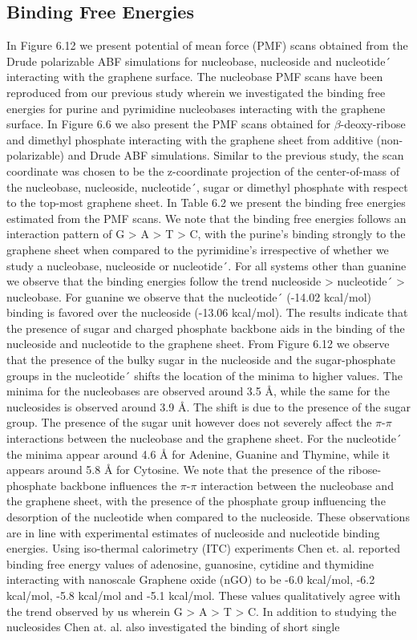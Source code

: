 \subsection[Binding Free Energies]{Binding Free Energies}
In Figure 6.12 we present potential of mean force (PMF) scans obtained from the Drude polarizable ABF simulations for nucleobase, nucleoside and nucleotide´ interacting with the graphene surface. The nucleobase PMF scans have been reproduced from our previous study wherein we investigated the binding free energies for purine and pyrimidine nucleobases interacting with the graphene surface.\supercite{h_polarization_2021} In Figure 6.6 we also present the PMF scans obtained for $\beta$-deoxy-ribose and dimethyl phosphate interacting with the graphene sheet from additive (non-polarizable) and Drude ABF simulations. Similar to the previous study, the scan coordinate was chosen to be the z-coordinate projection of the center-of-mass of the nucleobase, nucleoside, nucleotide´, sugar or dimethyl phosphate with respect to the top-most graphene sheet. In Table 6.2 we present the binding free energies estimated from the PMF scans. We note that the binding free energies follows an interaction pattern of G > A > T > C, with the purine’s binding strongly to the graphene sheet when compared to the pyrimidine’s irrespective of whether we study a nucleobase, nucleoside or nucleotide´. For all systems other than guanine we observe that the binding energies follow the trend nucleoside > nucleotide´ > nucleobase. For guanine we observe that the nucleotide´ (-14.02 kcal/mol) binding is favored over the nucleoside (-13.06 kcal/mol). The results indicate that the presence of sugar and charged phosphate backbone aids in the binding of the nucleoside and nucleotide to the graphene sheet. From Figure 6.12 we observe that the presence of the bulky sugar in the nucleoside and the sugar-phosphate groups in the nucleotide´ shifts the location of the minima to higher values. The minima for the nucleobases are observed around 3.5 Å, while the same for the nucleosides is observed around 3.9 Å. The shift is due to the presence of the sugar group. The presence of the sugar unit however does not severely affect the $\pi$-$\pi$ interactions between the nucleobase and the graphene sheet. For the nucleotide´ the minima appear around 4.6 Å for Adenine, Guanine and Thymine, while it appears around 5.8 Å for Cytosine. We note that the presence of the ribose-phosphate backbone influences the $\pi$-$\pi$ interaction between the nucleobase and the graphene sheet, with the presence of the phosphate group influencing the desorption of the nucleotide when compared to the nucleoside. These observations are in line with experimental estimates of nucleoside and nucleotide binding energies. Using iso-thermal calorimetry (ITC) experiments Chen et. al. reported binding free energy values of adenosine, guanosine, cytidine and thymidine interacting with nanoscale Graphene oxide (nGO) to be -6.0 kcal/mol, -6.2 kcal/mol, -5.8 kcal/mol and -5.1 kcal/mol.\supercite{ranganathan_complex_2016} These values qualitatively agree with the trend observed by us wherein G > A > T > C. In addition to studying the nucleosides Chen at. al. also investigated the binding of short single 